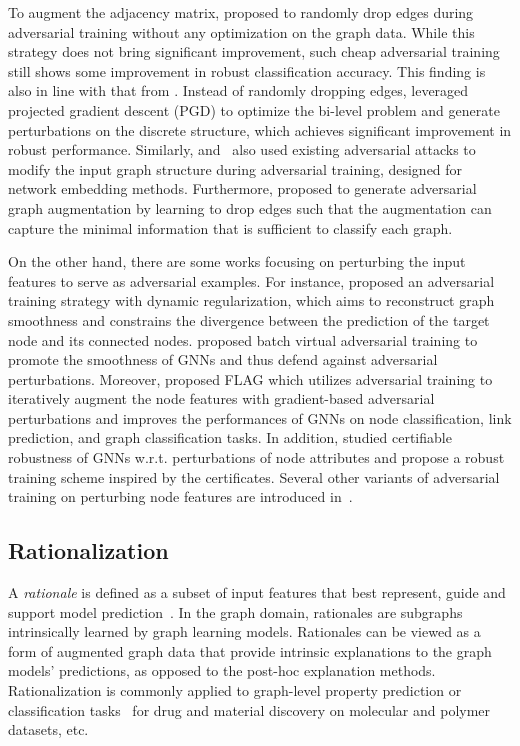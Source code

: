 \documentclass[11pt]{article}
\begin{document}
To augment the adjacency matrix, \citet{dai2018adversarial} proposed to randomly drop edges during adversarial training without any optimization on the graph data. While this strategy does not bring significant improvement, such cheap adversarial training still shows some improvement in robust classification accuracy. This finding is also in line with that from \citet{zugner2020certifiable}. Instead of randomly dropping edges, \citet{xu2019topology} leveraged projected gradient descent (PGD) to optimize the bi-level problem and generate perturbations on the discrete structure, which achieves significant improvement in robust performance. Similarly, \citet{chen2019can} and~\citet{dai2019adversarial} also used existing adversarial attacks to modify the input graph structure during adversarial training, designed for network embedding methods. Furthermore, \citet{suresh2021adversarial} proposed to generate adversarial graph augmentation by learning to drop edges such that the augmentation can capture the minimal information that is sufficient to classify each graph. 

On the other hand, there are some works focusing on perturbing the input features to serve as adversarial examples. For instance, \citet{feng2019graph} proposed an adversarial training strategy with dynamic regularization, which aims to reconstruct graph smoothness and constrains the divergence between the prediction of the target node and its connected nodes. \citet{deng2019batch} proposed batch virtual adversarial training to promote the smoothness of GNNs and thus defend against adversarial perturbations. Moreover, \citet{kong2022robust} proposed FLAG which utilizes adversarial training to iteratively augment the node features with gradient-based adversarial perturbations and improves the performances of GNNs on node classification, link prediction, and graph classification tasks. In addition, \citet{zugner2019certifiable} studied certifiable robustness of GNNs w.r.t. perturbations of node attributes and propose a robust training scheme inspired by the certificates.
Several other variants of adversarial training on perturbing node features are introduced in~\cite{wang2019graphdefense-adv-training,hu2021robust}.  

\subsection{Rationalization}
\label{sec:rat}
A \emph{rationale} is defined as a subset of input features that best represent, guide and support model prediction~\cite{liu2022graph}. In the graph domain, rationales are subgraphs intrinsically learned by graph learning models. Rationales can be viewed as a form of augmented graph data that provide intrinsic explanations to the graph models' predictions, as opposed to the post-hoc explanation methods. 
Rationalization is commonly applied to graph-level property prediction or classification tasks~\cite{wu2020generalization,liu2022graph, you2020graph, chenlearning, miao2022interpretable, li2022learning} for drug and material discovery on molecular and polymer datasets, etc. 
\end{document}
